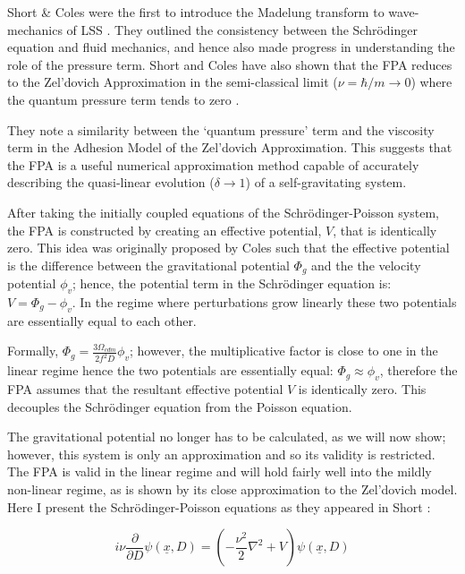 Short \& Coles were the first to introduce the Madelung transform to wave-mechanics of LSS \citep{bib_sho2}. They outlined the consistency between the Schr\"odinger equation and fluid mechanics, and hence also made progress in understanding the role of the pressure term. Short and Coles have also shown that the FPA reduces to the Zel'dovich Approximation in the semi-classical limit ($\nu = \hbar/m \rightarrow 0$) where the quantum pressure term tends to zero \citep{bib_short}.

They note a similarity between the `quantum pressure' term and the viscosity term in the Adhesion Model of the Zel'dovich Approximation. This suggests that the FPA is a useful numerical approximation method capable of accurately describing the quasi-linear evolution ($\delta \rightarrow 1$) of a self-gravitating system.

After taking the initially coupled equations of the Schr\"odinger-Poisson system, the FPA is constructed by creating an effective potential, $V$, that is identically zero. This idea was originally proposed by Coles such that the effective potential is the difference between the gravitational potential $\Phi_g $ and the the velocity potential $\phi_v$; hence, the potential term in the Schr\"odinger equation is: $V =\Phi_g-\phi_v$. In the regime where perturbations grow linearly these two potentials are essentially equal to each other. 

Formally,  $\Phi_g = \frac{3\Omega_{cdm}}{2 f^2 D} \phi_v$; however, the multiplicative factor is close to one \citep{bib_short} in the linear regime hence the two potentials are essentially equal: $\Phi_g \approx \phi_v$, therefore the FPA assumes that the resultant effective potential $V$ is identically zero. This decouples the Schr\"odinger equation from the Poisson equation.

The gravitational potential no longer has to be calculated, as we will now show;  however, this system is only an approximation and so its validity is restricted. The FPA is valid in the linear regime and will hold fairly well into the mildly non-linear regime, as is shown by its close approximation to the Zel'dovich model. Here I present the Schr\"odinger-Poisson equations as they appeared in Short \citep{bib_short}:

\begin{equation}
\label{eqn_schfp}
 i\nu\frac{\partial}{\partial D}\psi(\underline{x},D) = (-\frac{\nu^2}{2}\nabla^2 + V) \psi(\underline{x},D)
\end{equation}

